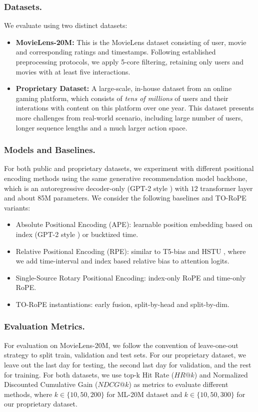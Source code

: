 \documentclass[sigconf]{acmart}
\begin{document}
\subsubsection{Datasets.}
\label{par:datasets}
We evaluate using two distinct datasets:
\begin{itemize}
\item  \textbf{MovieLens-20M:} This is the MovieLens dataset consisting of user, movie and corresponding ratings and timestamps. Following established preprocessing protocols, we apply 5-core filtering, retaining only users and movies with at least five interactions.
\item \textbf{Proprietary Dataset:} A large-scale, in-house dataset from an online gaming platform, which consists of \emph{tens of millions} of users and their interations with content on this platform over one year. This dataset presents more challenges from real-world scenario, including large number of users, longer sequence lengths and a much larger action space.
\end{itemize}

\subsubsection{Models and Baselines.}
\label{par:models}
For both public and proprietary datasets, we experiment with different positional encoding methods using the same generative recommendation model backbone, which is an autoregressive decoder-only (GPT-2 style \cite{Radford2019LanguageMA}) with $12$ transformer layer and about 85M parameters. We consider the following baselines and TO-RoPE variants:
\begin{itemize}
\item Absolute Positional Encoding (APE): learnable position embedding based on index (GPT-2 style \cite{Radford2019LanguageMA}) or bucktized time.
\item Relative Positional Encoding (RPE): similar to T5-bias \cite{Raffel2019ExploringTL} and HSTU \cite{Zhai2024ActionsSL}, where we add time-interval and index based relative bias to attention logits.
\item Single-Source Rotary Positional Encoding: index-only RoPE and time-only RoPE.
\item TO-RoPE instantiations: early fusion, split-by-head and split-by-dim.
\end{itemize}




\subsubsection{Evaluation Metrics.}
\label{par:metrics}
For evaluation on MovieLens-20M, we follow the convention of leave-one-out strategy \cite{Kang2018SasRec} to split train, validation and test sets. For our proprietary dataset, we leave out the last day for testing, the second last day for validation, and the rest for training.
For both datasets, we use top-k Hit Rate ($HR@k$) and Normalized Discounted Cumulative Gain ($NDCG@k$) as metrics to evaluate different methods, where $k \in \{10, 50, 200\}$ for ML-20M dataset and $k \in \{10, 50, 300\}$ for our proprietary dataset.
\end{document}
